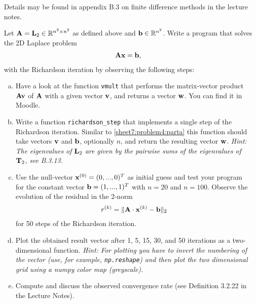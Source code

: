 \begin{Sheet}
\begin{Problem}[Programming]
    Details may be found in appendix B.3 on finite difference methods in the lecture notes. 
    
    Let $\mathbf A=\mathbf L_2\in\mathbb R^{n^2\times n^2}$ as defined above and $\mathbf b\in \mathbb R^{n^2}$.
    Write a program that solves the 2D Laplace problem
    \begin{gather*}
      \mathbf A\mathbf x=\mathbf b,
    \end{gather*}
    with the Richardson iteration by observing the following
    steps:
    \begin{enumerate}[(a)]
    \item\label{sheet7:problem4:parta} Have a look at the function
      \lstinline{vmult} that performs the matrix-vector product
      $\mathbf A\mathbf v$ of $\mathbf A$ with a given vector $\mathbf v$, and
      returns a vector $\mathbf w$.
      You can find it in Moodle.
    \item Write a function \lstinline{richardson_step} that
      implements a single step of the Richardson iteration. Similar to 
      \eqref{sheet7:problem4:parta} this function should take vectors
      $\mathbf v$ and $\mathbf b$, optionally $n$, and return the resulting vector $\mathbf w$.
      \textit{Hint: The eigenvalues of $\mathbf L_2$ are given by the pairwise sums of the eigenvalues of $\mathbf T_2$, see B.3.13.}
    \item Use the null-vector $\mathbf x^{(0)} = (0,...,0)^T$ as initial
      guess and test your program for the constant vector $\mathbf b=(1,...,1)^T$ with $n=20$ and $n=100$.
      Observe the evolution of the residual in the 2-norm
      \begin{gather*}
        r^{(k)} = \lVert\mathbf A\cdot\mathbf x^{(k)}-\mathbf b\rVert_2
      \end{gather*}
      for 50 steps of the Richardson iteration.  
   \item Plot the obtained
      result vector after 1, 5, 15, 30, and 50 iterations as a two-dimensional function.
      \textit{Hint: For plotting you have to invert the numbering of the vector (use, for example, \lstinline{np.reshape}) and then plot the two dimensional grid using a numpy color map (greyscale).}      
  \item Compute and discuss the observed convergence rate (see Definition 3.2.22 in the Lecture Notes).
   \end{enumerate}
  \end{Problem}

\end{Sheet}


